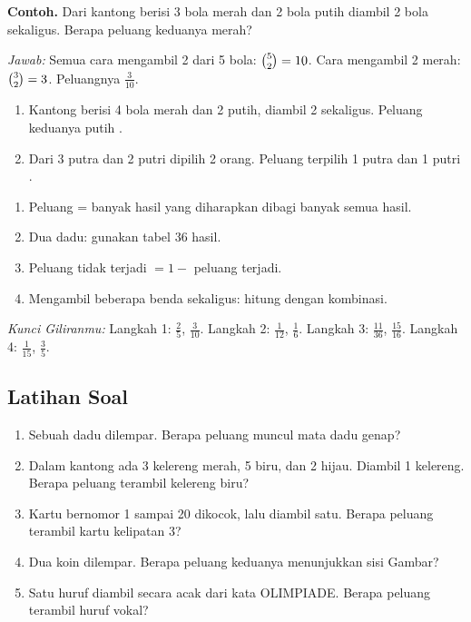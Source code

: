 \documentclass[11pt,a4paper]{article}
\begin{document}
\begin{contoh}
\textbf{Contoh.} Dari kantong berisi 3 bola merah dan 2 bola putih diambil 2 bola sekaligus.
Berapa peluang keduanya merah?

\textit{Jawab:} Semua cara mengambil 2 dari 5 bola: $\binom{5}{2} = 10$. Cara mengambil 2 merah:
$\binom{3}{2} = 3$. Peluangnya \textbf{$\frac{3}{10}$}.
\end{contoh}

\begin{giliranmu}
\begin{enumerate}[label=\alph*.]
    \item Kantong berisi 4 bola merah dan 2 putih, diambil 2 sekaligus. Peluang keduanya putih \kosong.
    \item Dari 3 putra dan 2 putri dipilih 2 orang. Peluang terpilih 1 putra dan 1 putri \kosong.
\end{enumerate}
\end{giliranmu}

\begin{rangkuman}
\begin{enumerate}
    \item Peluang = banyak hasil yang diharapkan dibagi banyak semua hasil.
    \item Dua dadu: gunakan tabel 36 hasil.
    \item Peluang tidak terjadi $= 1 -$ peluang terjadi.
    \item Mengambil beberapa benda sekaligus: hitung dengan kombinasi.
\end{enumerate}
\end{rangkuman}

\textit{Kunci Giliranmu:} Langkah 1: $\frac{2}{5}$, $\frac{3}{10}$. \quad Langkah 2:
$\frac{1}{12}$, $\frac{1}{6}$. \quad Langkah 3: $\frac{11}{36}$, $\frac{15}{16}$. \quad
Langkah 4: $\frac{1}{15}$, $\frac{3}{5}$.

\newpage
\subsection*{Latihan Soal}

\begin{enumerate}
  \item Sebuah dadu dilempar. Berapa peluang muncul mata dadu genap?
  \item Dalam kantong ada 3 kelereng merah, 5 biru, dan 2 hijau. Diambil 1 kelereng. Berapa peluang
        terambil kelereng biru?
  \item Kartu bernomor 1 sampai 20 dikocok, lalu diambil satu. Berapa peluang terambil kartu
        kelipatan 3?
  \item Dua koin dilempar. Berapa peluang keduanya menunjukkan sisi Gambar?
  \item Satu huruf diambil secara acak dari kata OLIMPIADE. Berapa peluang terambil huruf vokal?
\end{enumerate}
\end{document}
